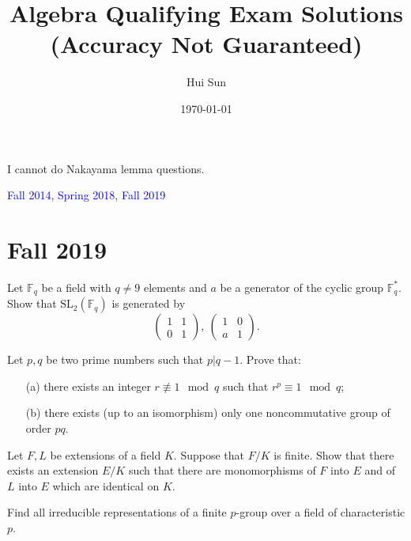 \documentclass[openany]{book}
\title{Algebra Qualifying Exam Solutions
\\ 
\vspace{0.4cm}
\Large (Accuracy Not Guaranteed)}
\date{\today}
\author{Hui Sun}
\begin{document}
\maketitle

\tableofcontents
\newpage


\begin{warn}
    I cannot do Nakayama lemma questions.
\end{warn}


\textcolor{blue}{Fall 2014, Spring 2018, Fall 2019}


\chapter{Fall 2019}


\begin{prob}
    Let \(\mathbb{F}_{q}\) be a field with \(q\neq 9\) elements and \(a\) be a generator of the cyclic group \(\mathbb{F}^{*}_{q}\). Show that \(\mathrm{SL}_{2}(\mathbb{F}_{q})\) is generated by
    \[\left(\begin{array}{cc}1&1\\0&1\end{array}\right),\ \left(\begin{array}{cc}1&0\\a&1\end{array}\right).\]
\end{prob}



\begin{prob}
    Let \(p,q\) be two prime numbers such that \(p|q-1\). Prove that:
    \begin{itemize}
        \item[(a)] there exists an integer \(r\not\equiv 1\mod q\) such that \(r^{p}\equiv 1\mod q\);
        \item[(b)] there exists (up to an isomorphism) only one noncommutative group of order \(pq\).
    \end{itemize}
\end{prob}


\begin{prob}
    Let \(F,L\) be extensions of a field \(K\). Suppose that \(F/K\) is finite. Show that there exists an extension \(E/K\) such that there are monomorphisms of \(F\) into \(E\) and of \(L\) into \(E\) which are identical on \(K\).
\end{prob}



\begin{prob}
    Find all irreducible representations of a finite \(p\)-group over a field of characteristic \(p\).
\end{prob}
\end{document}
